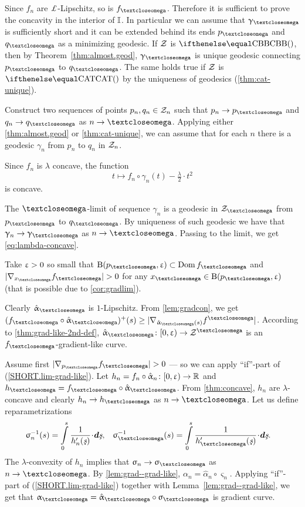 Since $f_n$ are $\Lip$-Lipschitz, so is $f_\o$.
Therefore it is sufficient to prove the concavity in the interior of $\mathbb{I}$.
In particular we can assume that $\gamma_\o$ is sufficiently short and it  can be extended behind its ends $p_\o$ and $q_\o$ as a minimizing geodesic.
If $\mathcal{Z}$ is $\Alex{}$, then by Theorem~\ref{thm:almost.geod}, $\gamma_\o$ is unique geodesic connecting $p_\o$ to $q_\o$.
The same holds true if $\mathcal{Z}$ is $\CAT{}$ by the uniqueness of geodesics (\ref{thm:cat-unique}).

Construct two sequences of points $p_n,q_n\in\spc{Z}_n$ such that $p_n\to p_\o$ and $q_n\to q_\o$ as $n\to \o$.
Applying either \ref{thm:almost.geod} or \ref{thm:cat-unique},
we can assume that for each $n$ there is a geodesic $\gamma_n$ from $p_n$ to $q_n$ in $\mathcal{Z}_n$.

Since $f_n$ is $\lambda$ concave, the function 
\[t\mapsto f_n\circ\gamma_n(t)-\tfrac\lambda 2\cdot t^2\]
is concave.

The $\o$-limit of sequence $\gamma_n$ is a geodesic in $\spc{Z}_\o$ from $p_\o$ to $q_\o$.
By uniqueness of such geodesic we have that $\gamma_n\to \gamma_\o$ as $n\to \o$.
Passing to the limit, we get \ref{eq:lambda-concave}.

Take $\upvarepsilon>0$ so small that $\oBall(p_\o,\eps)\subset\Dom f_\o$ and $|\nabla_{x_\o}f_\o|>0$ for any $x_\o\in\oBall(p_\o,\eps)$ (that is possible due to \ref{cor:gradlim}).

Clearly $\hat\alpha_\o$ is $1$-Lipschitz.
From \ref{lem:gradcon}, we get 
$(f_\o\circ\hat\alpha_\o)^+(s)
\ge
|\nabla_{\hat\alpha_\o(s)}f^\o|$.
According to \ref{thm:grad-like-2nd-def}, $\hat\alpha_\o\:[0,\eps)\to \spc{Z}^\o$  is an $f_\o$-gradient-like curve.

Assume first $|\nabla_{p_\o}f_\o|>0$ ---
so we can apply ``if''-part of (\ref{SHORT.lim-grad-like}).
Let $h_n=f_n\circ\hat\alpha_n\:[0,\eps)\to \RR$ 
and $h_\o=f_\o\circ\hat\alpha_\o$.
From \ref{thm:concave}, $h_n$ are $\lambda$-concave and clearly $h_n\to h_\o$ as $n\to\o$.
Let us define reparametrizations
\begin{align*}
{\varsigma_n^{-1}(s)}
&=
\int\limits_0^{s}\frac{1}{h_n'(\under s)}\cdot\dd\under s,
&
{\varsigma_\o^{-1}(s)}
&=
\int\limits_0^{s}\frac{1}{h_\o'(\under s)}\cdot\dd\under s.
\end{align*}
The $\lambda$-convexity of $h_n$ implies that $\sigma_n\to\sigma_\o$ as $n\to\o$.
By \ref{lem:grad--grad-like}, 
$\alpha_n=\hat\alpha_n\circ\varsigma_n$.
Applying ``if''-part of (\ref{SHORT.lim-grad-like}) together with Lemma~\ref{lem:grad--grad-like},
we get that $\alpha_\o=\hat\alpha_\o\circ\varsigma_\o$ is gradient curve.

